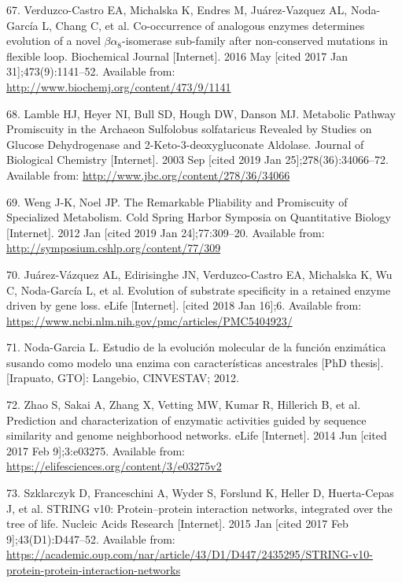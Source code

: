 \documentclass[12pt,twoside]{reedthesis}
\begin{document}
  \hypertarget{ref-verduzco-castro_co-occurrence_2016}{}
  67. Verduzco-Castro EA, Michalska K, Endres M, Juárez-Vazquez AL,
  Noda-García L, Chang C, et al. Co-occurrence of analogous enzymes
  determines evolution of a novel \(\beta\alpha_8\)-isomerase sub-family
  after non-conserved mutations in flexible loop. Biochemical Journal
  {[}Internet{]}. 2016 May {[}cited 2017 Jan 31{]};473(9):1141--52.
  Available from: \url{http://www.biochemj.org/content/473/9/1141}
  
  \hypertarget{ref-lamble_archaea_promiscuou_pathways_2003}{}
  68. Lamble HJ, Heyer NI, Bull SD, Hough DW, Danson MJ. Metabolic Pathway
  Promiscuity in the Archaeon Sulfolobus solfataricus Revealed by Studies
  on Glucose Dehydrogenase and 2-Keto-3-deoxygluconate Aldolase. Journal
  of Biological Chemistry {[}Internet{]}. 2003 Sep {[}cited 2019 Jan
  25{]};278(36):34066--72. Available from:
  \url{http://www.jbc.org/content/278/36/34066}
  
  \hypertarget{ref-weng_promiscuity_specialized_pathways_2012}{}
  69. Weng J-K, Noel JP. The Remarkable Pliability and Promiscuity of
  Specialized Metabolism. Cold Spring Harbor Symposia on Quantitative
  Biology {[}Internet{]}. 2012 Jan {[}cited 2019 Jan 24{]};77:309--20.
  Available from: \url{http://symposium.cshlp.org/content/77/309}
  
  \hypertarget{ref-juarez-vazquez_evolution_2017}{}
  70. Juárez-Vázquez AL, Edirisinghe JN, Verduzco-Castro EA, Michalska K,
  Wu C, Noda-García L, et al. Evolution of substrate specificity in a
  retained enzyme driven by gene loss. eLife {[}Internet{]}. {[}cited 2018
  Jan 16{]};6. Available from:
  \url{https://www.ncbi.nlm.nih.gov/pmc/articles/PMC5404923/}
  
  \hypertarget{ref-noda_tesis_2012}{}
  71. Noda-Garcia L. Estudio de la evolución molecular de la función
  enzimática susando como modelo una enzima con características
  ancestrales {[}PhD thesis{]}. {[}Irapuato, GTO{]}: Langebio, CINVESTAV;
  2012.
  
  \hypertarget{ref-zhao__function_prediction_neighbourhood_2014}{}
  72. Zhao S, Sakai A, Zhang X, Vetting MW, Kumar R, Hillerich B, et al.
  Prediction and characterization of enzymatic activities guided by
  sequence similarity and genome neighborhood networks. eLife
  {[}Internet{]}. 2014 Jun {[}cited 2017 Feb 9{]};3:e03275. Available
  from: \url{https://elifesciences.org/content/3/e03275v2}
  
  \hypertarget{ref-szklarczyk_string_2015}{}
  73. Szklarczyk D, Franceschini A, Wyder S, Forslund K, Heller D,
  Huerta-Cepas J, et al. STRING v10: Protein--protein interaction
  networks, integrated over the tree of life. Nucleic Acids Research
  {[}Internet{]}. 2015 Jan {[}cited 2017 Feb 9{]};43(D1):D447--52.
  Available from:
  \url{https://academic.oup.com/nar/article/43/D1/D447/2435295/STRING-v10-protein-protein-interaction-networks}
  
\end{document}
